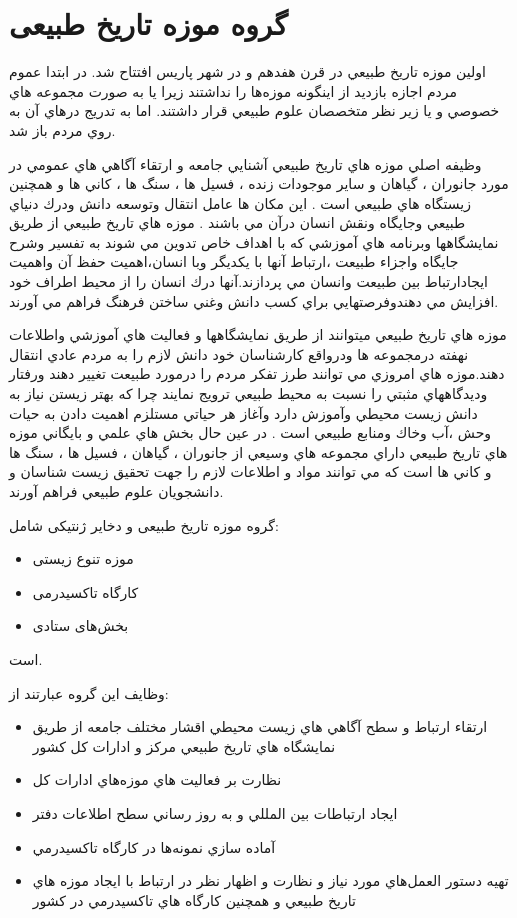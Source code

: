 \section{گروه موزه تاریخ طبیعی}
اولين موزه تاريخ طبيعي در قرن
هفدهم و در شهر پاريس افتتاح شد.
در ابتدا عموم مردم اجازه بازديد از اينگونه موزه‌ها را نداشتند زيرا يا به
صورت مجموعه هاي خصوصي و يا زير نظر متخصصان علوم طبيعي قرار داشتند. اما به تدريج درهاي آن به
روي مردم باز شد.

وظيفه اصلي موزه هاي تاريخ طبيعي آشنايي جامعه و ارتقاء آگاهي هاي عمومي در مورد جانوران ، گياهان و 
ساير موجودات زنده ، فسيل ها ، سنگ ها ، كاني ها و همچنين زيستگاه هاي طبيعي است . اين مكان ها 
عامل انتقال وتوسعه دانش ودرك دنياي طبيعي وجايگاه ونقش انسان درآن مي باشند . موزه هاي تاريخ طبيعي
از طريق نمايشگاهها وبرنامه هاي آموزشي كه با اهداف خاص تدوين مي شوند به تفسير وشرح جايگاه واجزاء
طبيعت ،ارتباط آنها با يكديگر وبا انسان،اهميت حفظ آن واهميت ايجادارتباط بين طبيعت وانسان مي
پردازند.آنها درك انسان را از محيط اطراف خود افزايش مي دهندوفرصتهايي براي كسب دانش وغني ساختن
فرهنگ فراهم مي آورند.

موزه هاي تاريخ طبيعي ميتوانند از طريق نمايشگاهها و فعاليت هاي آموزشي واطلاعات
نهفته درمجموعه ها ودرواقع كارشناسان خود دانش لازم را به مردم عادي انتقال دهند.موزه هاي امروزي مي
توانند طرز تفكر مردم را درمورد طبيعت تغيير دهند ورفتار وديدگاههاي مثبتي را نسبت به محيط طبيعي
ترويج نمايند چرا كه بهتر زيستن نياز به دانش زيست محيطي وآموزش دارد وآغاز هر حياتي مستلزم اهميت
دادن به حيات وحش ،آب وخاك ومنابع طبيعي است . در عين حال بخش هاي علمي و بايگاني موزه هاي تاريخ
طبيعي داراي مجموعه هاي وسيعي از جانوران ، گياهان ، فسيل ها ، سنگ ها و كاني ها است كه مي توانند مواد
و اطلاعات لازم را جهت تحقيق زيست شناسان و دانشجويان علوم طبيعي فراهم آورند.



گروه موزه تاریخ طبیعی و دخایر ژنتیکی شامل:
\begin{itemize}
    \item موزه تنوع زیستی
    \item کارگاه تاکسیدرمی
    \item بخش‌های ستادی
\end{itemize}
است.

وظایف این گروه عبارتند از:

\begin{itemize}
    \item ارتقاء ارتباط و سطح آگاهي هاي زيست محيطي اقشار مختلف جامعه از طريق نمايشگاه
    هاي تاريخ طبيعي مركز و ادارات كل كشور
    \item نظارت بر فعاليت هاي موزه‌هاي ادارات كل
    \item ايجاد ارتباطات بين المللي و به روز رساني سطح اطلاعات دفتر
    \item آماده سازي نمونه‌ها در كارگاه تاكسيدرمي
    \item تهيه دستور العمل‌هاي مورد نياز و نظارت و اظهار نظر در ارتباط با ايجاد موزه هاي تاريخ
    طبيعي و همچنين كارگاه هاي تاكسيدرمي در كشور
\end{itemize}

